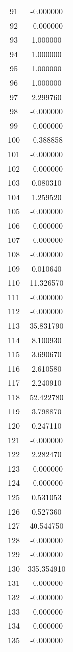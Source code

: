 \documentclass[12pt]{article}
\begin{document}
\begin{longtable}{@{}cc@{}}
91 & -0.000000 \\
92 & -0.000000 \\
93 & 1.000000 \\
94 & 1.000000 \\
95 & 1.000000 \\
96 & 1.000000 \\
97 & 2.299760 \\
98 & -0.000000 \\
99 & -0.000000 \\
100 & -0.388858 \\
101 & -0.000000 \\
102 & -0.000000 \\
103 & 0.080310 \\
104 & 1.259520 \\
105 & -0.000000 \\
106 & -0.000000 \\
107 & -0.000000 \\
108 & -0.000000 \\
109 & 0.010640 \\
110 & 11.326570 \\
111 & -0.000000 \\
112 & -0.000000 \\
113 & 35.831790 \\
114 & 8.100930 \\
115 & 3.690670 \\
116 & 2.610580 \\
117 & 2.240910 \\
118 & 52.422780 \\
119 & 3.798870 \\
120 & 0.247110 \\
121 & -0.000000 \\
122 & 2.282470 \\
123 & -0.000000 \\
124 & -0.000000 \\
125 & 0.531053 \\
126 & 0.527360 \\
127 & 40.544750 \\
128 & -0.000000 \\
129 & -0.000000 \\
130 & 335.354910 \\
131 & -0.000000 \\
132 & -0.000000 \\
133 & -0.000000 \\
134 & -0.000000 \\
135 & -0.000000 \\

\end{longtable}
\end{document}
